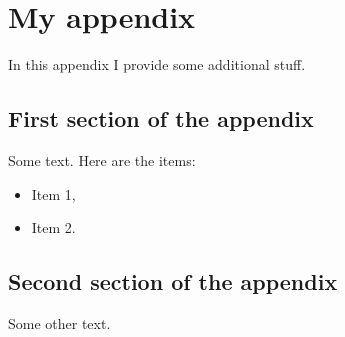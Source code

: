 \chapter{My appendix}
\label{ch:appendix}

In this appendix I provide some additional stuff.

\section{First section of the appendix}

Some text. Here are the items:
\begin{itemize}
	\item Item 1,
	\item Item 2.
\end{itemize}

\section{Second section of the appendix}

Some other text.
